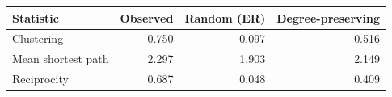 
\begin{tabular}{lrrr}
\toprule
Statistic & Observed & Random (ER) & Degree-preserving\\
\midrule
Clustering & 0.750 & 0.097 & 0.516\\
Mean shortest path & 2.297 & 1.903 & 2.149\\
Reciprocity & 0.687 & 0.048 & 0.409\\
\bottomrule
\end{tabular}
